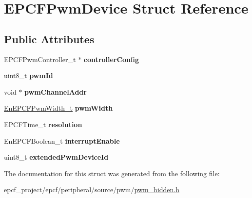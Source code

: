 \hypertarget{structEPCFPwmDevice}{}\section{E\+P\+C\+F\+Pwm\+Device Struct Reference}
\label{structEPCFPwmDevice}
\subsection*{Public Attributes}
\begin{DoxyCompactItemize}
\item 
\mbox{\label{structEPCFPwmDevice_a35e7399c8f6f206a0c11f3f0c6ecfad9}} 
E\+P\+C\+F\+Pwm\+Controller\+\_\+t $\ast$ {\bfseries controller\+Config}
\item 
\mbox{\label{structEPCFPwmDevice_a5fe5b5179f9de425a957b708227668be}} 
uint8\+\_\+t {\bfseries pwm\+Id}
\item 
\mbox{\label{structEPCFPwmDevice_a85ca75cacb902783701a294295be36bb}} 
void $\ast$ {\bfseries pwm\+Channel\+Addr}
\item 
\mbox{\label{structEPCFPwmDevice_aa0afbfc34b6e89a0c356ca7806a8158a}} 
\mbox{\hyperlink{pwm_8h_adc2248862ed98f44dfc603f88fee97be}{En\+E\+P\+C\+F\+Pwm\+Width\+\_\+t}} {\bfseries pwm\+Width}
\item 
\mbox{\label{structEPCFPwmDevice_a2219cc643ca55f505ce9dc6bc64a33c4}} 
E\+P\+C\+F\+Time\+\_\+t {\bfseries resolution}
\item 
\mbox{\label{structEPCFPwmDevice_ac1cc44b5d1eb2dcdb90131f610e97690}} 
En\+E\+P\+C\+F\+Boolean\+\_\+t {\bfseries interrupt\+Enable}
\item 
\mbox{\label{structEPCFPwmDevice_afe03860c88d9259c522af73f6e17f225}} 
uint8\+\_\+t {\bfseries extended\+Pwm\+Device\+Id}
\end{DoxyCompactItemize}


The documentation for this struct was generated from the following file\+:\begin{DoxyCompactItemize}
\item 
epcf\+\_\+project/epcf/peripheral/source/pwm/\mbox{\hyperlink{pwm__hidden_8h}{pwm\+\_\+hidden.\+h}}\end{DoxyCompactItemize}
